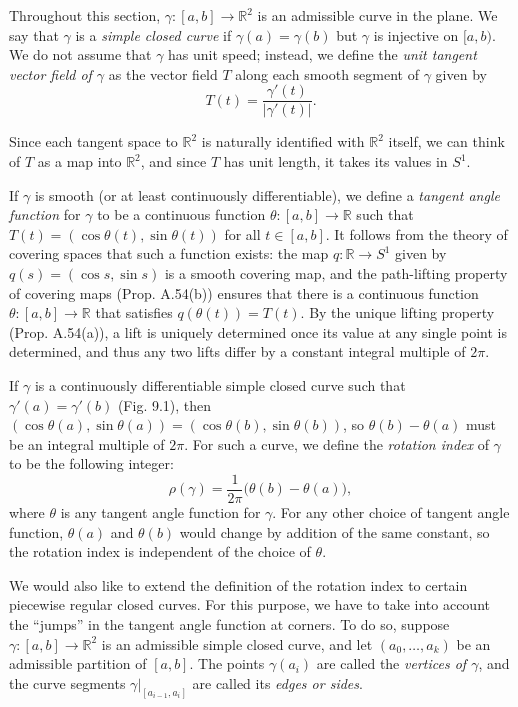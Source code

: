 Throughout this section, $\gamma : [a,b] \to \mathbb{R}^2$ is an admissible curve in the plane. We
say that $\gamma$ is a \emph{simple closed curve} if $\gamma(a) = \gamma(b)$ but $\gamma$ is injective on $[a, b)$. We do not
assume that $\gamma$ has unit speed; instead, we define the \emph{unit tangent vector field of $\gamma$} as
the vector field $T$ along each smooth segment of $\gamma$ given by
\[
T(t) = \frac{\gamma'(t)}{|\gamma'(t)|}.
\]

Since each tangent space to $\mathbb{R}^2$ is naturally identified with $\mathbb{R}^2$ itself, we can think
of $T$ as a map into $\mathbb{R}^2$, and since $T$ has unit length, it takes its values in $S^1$.

If $\gamma$ is smooth (or at least continuously differentiable), we define a \emph{tangent angle
function} for $\gamma$ to be a continuous function $\theta: [a,b] \to \mathbb{R}$ such that $T(t) =
(\cos\theta(t), \sin\theta(t))$ for all $t \in [a,b]$. It follows from the theory of covering spaces
that such a function exists: the map $q: \mathbb{R} \to S^1$ given by $q(s) = (\cos s, \sin s)$ is
a smooth covering map, and the path-lifting property of covering maps (Prop.
A.54(b)) ensures that there is a continuous function $\theta: [a,b] \to \mathbb{R}$ that satisfies
$q(\theta(t)) = T(t)$. By the unique lifting property (Prop. A.54(a)),
a lift is uniquely determined once its value at any single point is determined, and thus any two lifts
differ by a constant integral multiple of $2\pi$.

If $\gamma$ is a continuously differentiable simple closed curve such that $\gamma'(a) = \gamma'(b)$
(Fig. 9.1), then $(\cos\theta(a), \sin\theta(a)) = (\cos\theta(b), \sin\theta(b))$, so $\theta(b) - \theta(a)$ must be an
integral multiple of $2\pi$. For such a curve, we define the \emph{rotation index} of $\gamma$ to be
the following integer:
\[
\rho(\gamma) = \frac{1}{2\pi} \bigl(\theta(b) - \theta(a)\bigr),
\]
where $\theta$ is any tangent angle function for $\gamma$. For any other choice of tangent angle
function, $\theta(a)$ and $\theta(b)$ would change by addition of the same constant, so the
rotation index is independent of the choice of $\theta$.

We would also like to extend the definition of the rotation index to certain piecewise
regular closed curves. For this purpose, we have to take into account the
``jumps'' in the tangent angle function at corners. To do so, suppose $\gamma: [a, b] \to \mathbb{R}^2$
is an admissible simple closed curve, and let $(a_0, \ldots, a_k)$ be an admissible partition of $[a,b]$. The points $\gamma(a_i)$ are called the \emph{vertices of $\gamma$}, and the curve segments $\gamma|_{[a_{i-1},a_i]}$ are called its \emph{edges or sides}.

